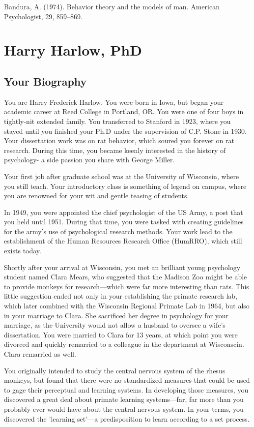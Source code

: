 \begin{refsection}
Bandura, A. (1974). Behavior theory and the models of man. American Psychologist, 29, 859--869.

\chapter{Harry Harlow, PhD}
\label{harryharlowphd}

\section{Your Biography}
\label{yourbiography}

You are Harry Frederick Harlow. You were born in Iowa, but began your academic career at Reed College in Portland, OR. You were one of four boys in tightly-nit extended family. You transferred to Stanford in 1923, where you stayed until you finished your Ph.D under the supervision of C.P. Stone in 1930. Your dissertation work was on rat behavior, which soured you forever on rat research. During this time, you became keenly interested in the history of psychology- a side passion you share with George Miller.

Your first job after graduate school was at the University of Wisconsin, where you still teach. Your introductory class is something of legend on campus, where you are renowned for your wit and gentle teasing of students.

In 1949, you were appointed the chief psychologist of the US Army, a post that you held until 1951. During that time, you were tasked with creating guidelines for the army's use of psychological research methods. Your work lead to the establishment of the Human Resources Research Office (HumRRO), which still exists today.

Shortly after your arrival at Wisconsin, you met an brilliant young psychology student named Clara Mears, who suggested that the Madison Zoo might be able to provide monkeys for research—which were far more interesting than rats. This little suggestion ended not only in your establishing the primate research lab, which later combined with the Wisconsin Regional Primate Lab in 1964, but also in your marriage to Clara. She sacrificed her degree in psychology for your marriage, as the University would not allow a husband to oversee a wife's dissertation. You were married to Clara for 13 years, at which point you were divorced and quickly remarried to a colleague in the department at Wisconscin. Clara remarried as well.

You originally intended to study the central nervous system of the rhesus monkeys, but found that there were no standardized measures that could be used to gage their perceptual and learning systems. In developing those measures, you discovered a great deal about primate learning systems—far, far more than you probably ever would have about the central nervous system. In your terms, you discovered the 'learning set'—a predisposition to learn according to a set process.


\end{refsection}
